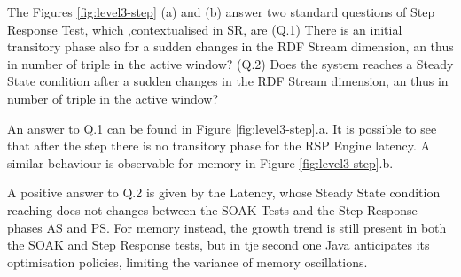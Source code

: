 The Figures \ref{fig:level3-step} (a) and (b) answer two standard questions of Step Response Test, which ,contextualised in SR, are (Q.1) There is an initial transitory phase also for a sudden changes in the RDF Stream dimension, an thus in number of triple in the active window? (Q.2) Does the system reaches a Steady State condition after a sudden changes in the RDF Stream dimension, an thus in number of triple in the active window?

An answer to Q.1 can be found in Figure \ref{fig:level3-step}.a. It is possible to see that after the step there is no transitory phase for the RSP Engine latency. A similar behaviour is observable for memory in Figure \ref{fig:level3-step}.b. 


A positive answer to Q.2 is given by the Latency, whose Steady State condition reaching does not changes between the SOAK Tests and the Step Response phases AS and PS. For memory instead, the growth trend is still present  in both the SOAK and Step Response tests, but in tje second one Java anticipates its optimisation policies, limiting the variance of memory oscillations. 

